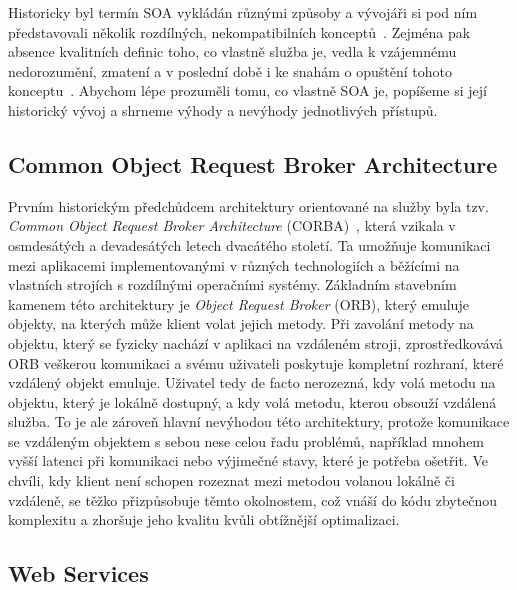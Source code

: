 Historicky byl termín SOA vykládán různými způsoby a vývojáři si
pod ním představovali několik rozdílných, nekompatibilních
konceptů~\cite{fowler2005serviceorientedambiguity}.
Zejména pak absence kvalitních definic toho, co vlastně
služba je, vedla k vzájemnému nedorozumění, zmatení a v poslední
době i ke snahám o opuštění tohoto konceptu~\cite{cerny2017disambiguation}.
Abychom lépe prozuměli tomu, co vlastně SOA je, popíšeme si její historický
vývoj a shrneme výhody a nevýhody jednotlivých přístupů.

\subsection{Common Object Request Broker Architecture}

Prvním historickým předchůdcem architektury orientované na služby
byla tzv. \textit{Common Object Request Broker Architecture}
(CORBA)~\cite{siegel2000corba}, která vzikala v osmdesátých a devadesátých letech
dvacátého století. Ta umožňuje komunikaci mezi aplikacemi implementovanými v
různých technologiích a běžícími na vlastních strojích s rozdílnými
operačními systémy. Základním stavebním kamenem této architektury
je \textit{Object Request Broker} (ORB), který emuluje objekty,
na kterých může klient volat jejich metody. Při zavolání metody
na objektu, který se fyzicky nachází v aplikaci na vzdáleném stroji,
zprostředkovává ORB veškerou komunikaci a svému uživateli poskytuje
kompletní rozhraní, které vzdálený objekt emuluje. Uživatel tedy de
facto nerozezná, kdy volá metodu na objektu, který je lokálně dostupný,
a kdy volá metodu, kterou obsouží vzdálená služba. To je ale zároveň
hlavní nevýhodou této architektury, protože komunikace se vzdáleným
objektem s sebou nese celou řadu problémů, například mnohem vyšší latenci
při komunikaci nebo výjimečné stavy, které je potřeba ošetřit. Ve chvíli,
kdy klient není schopen rozeznat mezi metodou volanou lokálně či vzdáleně,
se těžko přizpůsobuje těmto okolnostem, což vnáší do kódu zbytečnou
komplexitu a zhoršuje jeho kvalitu kvůli obtížnější optimalizaci.

\subsection{Web Services}

